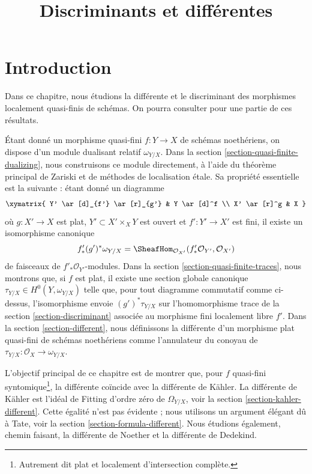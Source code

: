

%


\title{Discriminants et différentes}


\maketitle

\label{section-phantom}

\tableofcontents

\section{Introduction}
\label{section-introduction}

\noindent
Dans ce chapitre, nous étudions la différente et le discriminant
des morphismes localement quasi-finis de schémas.
On pourra consulter \cite{Kunz} pour une partie de ces résultats.

\medskip\noindent
Étant donné un morphisme quasi-fini $f : Y \to X$ de schémas noethériens,
on dispose d'un module dualisant relatif $\omega_{Y/X}$.
Dans la section \ref{section-quasi-finite-dualizing},
nous construisons ce module directement, à l'aide
du théorème principal de Zariski et de méthodes de localisation étale.
Sa propriété essentielle est la suivante : étant donné un diagramme
$$
\xymatrix{
Y' \ar[d]_{f'} \ar[r]_{g'} & Y \ar[d]^f \\
X' \ar[r]^g & X
}
$$
où $g : X' \to X$ est plat, $Y' \subset X' \times_X Y$ est ouvert et
$f' : Y' \to X'$ est fini, il existe un isomorphisme canonique
$$
f'_*(g')^*\omega_{Y/X} =
\SheafHom_{\mathcal{O}_{X'}}(f'_*\mathcal{O}_{Y'}, \mathcal{O}_{X'})
$$
de faisceaux de $f'_*\mathcal{O}_{Y'}$-modules. Dans la
section \ref{section-quasi-finite-traces}, nous montrons que,
si $f$ est plat, il existe une section globale canonique
$\tau_{Y/X} \in H^0(Y, \omega_{Y/X})$ telle que, pour tout diagramme
commutatif comme ci-dessus, l'isomorphisme envoie $(g')^*\tau_{Y/X}$ sur l'homomorphisme trace
de la section \ref{section-discriminant}
associée au morphisme fini localement libre $f'$.
Dans la section \ref{section-different},
nous définissons la différente d'un morphisme plat quasi-fini
de schémas noethériens comme l'annulateur du
conoyau de $\tau_{Y/X} : \mathcal{O}_X \to \omega_{Y/X}$.

\medskip\noindent
L'objectif principal de ce chapitre est de montrer que, pour
$f$ quasi-fini syntomique\footnote{Autrement dit plat et localement d'intersection complète.}, la
différente coïncide avec la différente de Kähler.
La différente de Kähler est l'idéal de Fitting d'ordre zéro de $\Omega_{Y/X}$, voir
la section \ref{section-kahler-different}.
Cette égalité n'est pas évidente ; nous utilisons un argument élégant
dû à Tate, voir la section \ref{section-formula-different}.
Nous étudions également, chemin faisant, la différente de Noether
et la différente de Dedekind.

